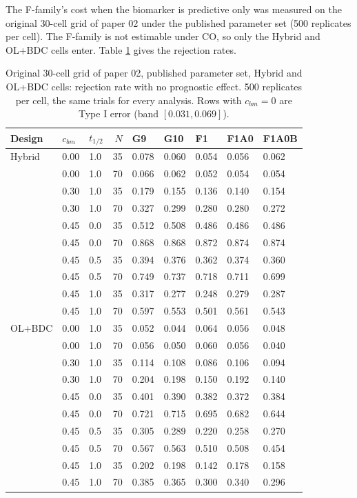 \documentclass[
  11pt,
]{article}
\begin{document}
The F-family's cost when the biomarker is predictive only was
measured on the original 30-cell grid of paper 02 under the published
parameter set (500 replicates per cell). The F-family is
not estimable under CO, so only the Hybrid and OL+BDC cells enter.
Table \ref{tab:tab-gvf} gives the rejection rates.

\begin{table}
\centering
\caption{\label{tab:tab-gvf}Original 30-cell grid of paper 02, published
      parameter set, Hybrid and OL+BDC cells: rejection rate with no
      prognostic effect. 500 replicates per cell, the same trials for
      every analysis. Rows with $c_{bm} = 0$ are Type I error (band
      $[0.031, 0.069]$).}
\centering
\fontsize{9}{11}\selectfont
\begin{tabular}[t]{lllrlllll}
\toprule
Design & $c_{bm}$ & $t_{1/2}$ & $N$ & G9 & G10 & F1 & F1A0 & F1A0B\\
\midrule
Hybrid & 0.00 & 1.0 & 35 & 0.078 & 0.060 & 0.054 & 0.056 & 0.062\\
 & 0.00 & 1.0 & 70 & 0.066 & 0.062 & 0.052 & 0.054 & 0.054\\
 & 0.30 & 1.0 & 35 & 0.179 & 0.155 & 0.136 & 0.140 & 0.154\\
 & 0.30 & 1.0 & 70 & 0.327 & 0.299 & 0.280 & 0.280 & 0.272\\
 & 0.45 & 0.0 & 35 & 0.512 & 0.508 & 0.486 & 0.486 & 0.486\\
 & 0.45 & 0.0 & 70 & 0.868 & 0.868 & 0.872 & 0.874 & 0.874\\
 & 0.45 & 0.5 & 35 & 0.394 & 0.376 & 0.362 & 0.374 & 0.360\\
 & 0.45 & 0.5 & 70 & 0.749 & 0.737 & 0.718 & 0.711 & 0.699\\
 & 0.45 & 1.0 & 35 & 0.317 & 0.277 & 0.248 & 0.279 & 0.287\\
 & 0.45 & 1.0 & 70 & 0.597 & 0.553 & 0.501 & 0.561 & 0.543\\
OL+BDC & 0.00 & 1.0 & 35 & 0.052 & 0.044 & 0.064 & 0.056 & 0.048\\
 & 0.00 & 1.0 & 70 & 0.056 & 0.050 & 0.060 & 0.056 & 0.040\\
 & 0.30 & 1.0 & 35 & 0.114 & 0.108 & 0.086 & 0.106 & 0.094\\
 & 0.30 & 1.0 & 70 & 0.204 & 0.198 & 0.150 & 0.192 & 0.140\\
 & 0.45 & 0.0 & 35 & 0.401 & 0.390 & 0.382 & 0.372 & 0.384\\
 & 0.45 & 0.0 & 70 & 0.721 & 0.715 & 0.695 & 0.682 & 0.644\\
 & 0.45 & 0.5 & 35 & 0.305 & 0.289 & 0.220 & 0.258 & 0.270\\
 & 0.45 & 0.5 & 70 & 0.567 & 0.563 & 0.510 & 0.508 & 0.454\\
 & 0.45 & 1.0 & 35 & 0.202 & 0.198 & 0.142 & 0.178 & 0.158\\
 & 0.45 & 1.0 & 70 & 0.385 & 0.365 & 0.300 & 0.340 & 0.296\\
\bottomrule
\end{tabular}
\end{table}
\end{document}
